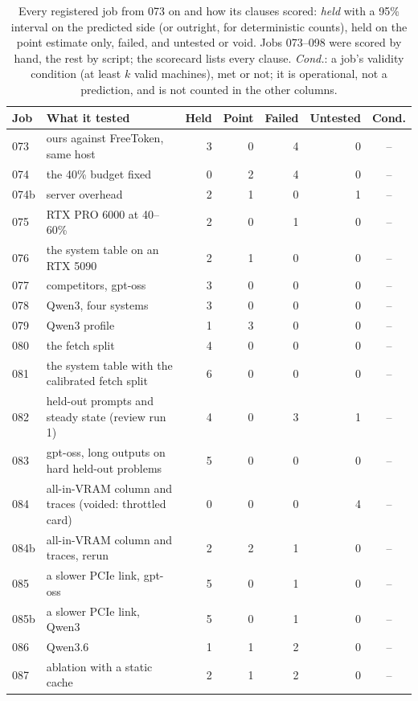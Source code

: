 \begin{table}[p]\centering\scriptsize
\caption{Every registered job from 073 on and how its clauses scored: \emph{held} with a 95\% interval on the predicted side (or outright, for deterministic counts), held on the point estimate only, failed, and untested or void. Jobs 073--098 were scored by hand, the rest by script; the scorecard lists every clause. \emph{Cond.}: a job's validity condition (at least $k$ valid machines), met or not; it is operational, not a prediction, and is not counted in the other columns.}\label{tab:prereg}
\setlength\tabcolsep{3pt}\begin{tabular}{@{}llrrrrc@{}}\toprule
Job & What it tested & Held & Point & Failed & Untested & Cond. \\\midrule
073 & ours against FreeToken, same host & 3 & 0 & 4 & 0 & -- \\
074 & the 40\% budget fixed & 0 & 2 & 4 & 0 & -- \\
074b & server overhead & 2 & 1 & 0 & 1 & -- \\
075 & RTX PRO 6000 at 40--60\% & 2 & 0 & 1 & 0 & -- \\
076 & the system table on an RTX 5090 & 2 & 1 & 0 & 0 & -- \\
077 & competitors, gpt-oss & 3 & 0 & 0 & 0 & -- \\
078 & Qwen3, four systems & 3 & 0 & 0 & 0 & -- \\
079 & Qwen3 profile & 1 & 3 & 0 & 0 & -- \\
080 & the fetch split & 4 & 0 & 0 & 0 & -- \\
081 & the system table with the calibrated fetch split & 6 & 0 & 0 & 0 & -- \\
082 & held-out prompts and steady state (review run 1) & 4 & 0 & 3 & 1 & -- \\
083 & gpt-oss, long outputs on hard held-out problems & 5 & 0 & 0 & 0 & -- \\
084 & all-in-VRAM column and traces (voided: throttled card) & 0 & 0 & 0 & 4 & -- \\
084b & all-in-VRAM column and traces, rerun & 2 & 2 & 1 & 0 & -- \\
085 & a slower PCIe link, gpt-oss & 5 & 0 & 1 & 0 & -- \\
085b & a slower PCIe link, Qwen3 & 5 & 0 & 1 & 0 & -- \\
086 & Qwen3.6 & 1 & 1 & 2 & 0 & -- \\
087 & ablation with a static cache & 2 & 1 & 2 & 0 & -- \\

\end{tabular}
\end{table}
